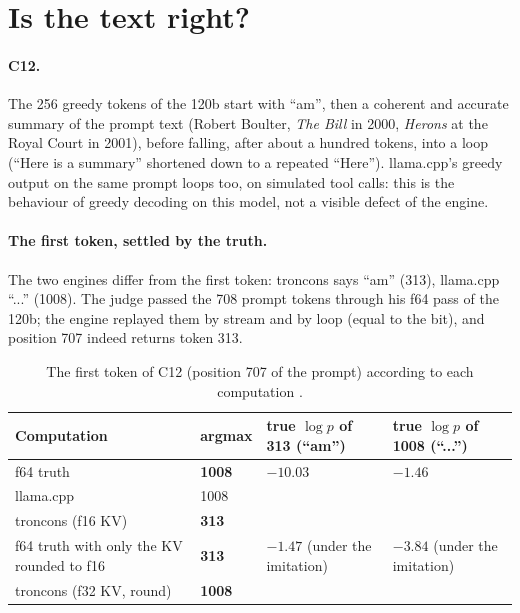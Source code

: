 \section{Is the text right?}\label{t2e-sec:texte}

\paragraph{C12.} The 256 greedy tokens of the 120b start with ``am'', then a coherent and accurate summary of the prompt text (Robert Boulter, \emph{The Bill} in 2000, \emph{Herons} at the Royal Court in 2001), before falling, after about a hundred tokens, into a loop (``Here is a summary'' shortened down to a repeated ``Here''). llama.cpp's greedy output on the same prompt loops too, on simulated tool calls: this is the behaviour of greedy decoding on this model, not a visible defect of the engine.

\paragraph{The first token, settled by the truth.} The two engines differ from the first token: troncons says ``am'' (313), llama.cpp ``...'' (1008). The judge passed the 708 prompt tokens through his f64 pass of the 120b; the engine replayed them by stream and by loop (equal to the bit), and position 707 indeed returns token 313.

\begin{table}[ht]
\centering\footnotesize
\caption[The first token of C12]{The first token of C12 (position 707 of the prompt) according to each computation \mes.}
\label{t2e-tab:premier}
\begin{tabular}{@{}llll@{}}
\toprule
Computation & argmax & true $\log p$ of 313 (``am'') & true $\log p$ of 1008 (``...'') \\
\midrule
f64 truth & \textbf{1008} & $-10.03$ & $-1.46$ \\
llama.cpp & 1008 & & \\
troncons (f16 KV) & \textbf{313} & & \\
f64 truth with only the KV rounded to f16 & \textbf{313} & $-1.47$ (under the imitation) & $-3.84$ (under the imitation) \\
troncons (f32 KV, round) & \textbf{1008} & & \\
\bottomrule
\end{tabular}
\end{table}

